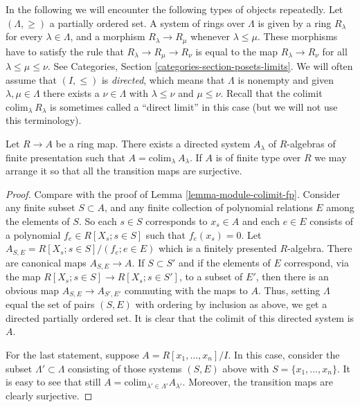 \noindent
In the following we will encounter the following types of
objects repeatedly. Let $(\Lambda, \geq)$ a partially
ordered set. A system of rings over $\Lambda$ is given by
a ring $R_\lambda$ for every $\lambda \in \Lambda$,
and a morphism $R_\lambda \to R_\mu$ whenever $\lambda \leq \mu$.
These morphisms have to satisfy the rule that
$R_\lambda \to R_\mu \to R_\nu$ is equal to the map
$R_\lambda \to R_\nu$ for all $\lambda \leq \mu \leq \nu$.
See Categories, Section \ref{categories-section-posets-limits}.
We will often assume that $(I, \leq)$ is {\it directed},
which means that $\Lambda$ is nonempty and
given $\lambda, \mu \in \Lambda$
there exists a $\nu \in \Lambda$ with $\lambda \leq \nu$ and $\mu \leq \nu$.
Recall that the colimit $\text{colim}_\lambda\ R_\lambda$
is sometimes called a ``direct limit'' in this case
(but we will not use this terminology).

\begin{lemma}
\label{lemma-ring-colimit-fp}
Let $R \to A$ be a ring map.
There exists a directed system $A_\lambda$ of
$R$-algebras of finite presentation such that
$A = \text{colim}_\lambda\ A_\lambda$.
If $A$ is of finite type over $R$ we may
arrange it so that all the transition maps
are surjective.
\end{lemma}

\begin{proof}
Compare with the proof of Lemma \ref{lemma-module-colimit-fp}.
Consider any finite subset $S \subset A$, and any finite
collection of polynomial relations $E$ among the elements of $S$.
So each $s \in S$ corresponds to $x_s \in A$ and
each $e \in E$ consists of a polynomial
$f_{e} \in R[X_s; s\in S]$ such that $f_e(x_s) = 0$.
Let $A_{S, E} = R[X_s; s\in S]/(f_e; e\in E)$
which is a finitely presented $R$-algebra.
There are canonical maps $A_{S, E} \to A$.
If $S \subset S'$ and if the elements of
$E$ correspond, via the map $R[X_s; s \in S] \to R[X_s; s\in S']$,
to a subset of $E'$, then there is an obvious map
$A_{S, E} \to A_{S', E'}$ commuting with the
maps to $A$. Thus, setting $\Lambda$ equal the set of pairs
$(S, E)$ with ordering by inclusion as above, we get a
directed partially ordered set.
It is clear that the colimit of this directed system is $A$.

\medskip\noindent
For the last statement, suppose $A = R[x_1, \ldots, x_n]/I$.
In this case, consider the subset $\Lambda' \subset \Lambda$
consisting of those systems $(S, E)$ above
with $S = \{x_1, \ldots, x_n\}$. It is easy to see that
still $A = \text{colim}_{\lambda' \in \Lambda'} A_{\lambda'}$.
Moreover, the transition maps are clearly surjective.
\end{proof}

